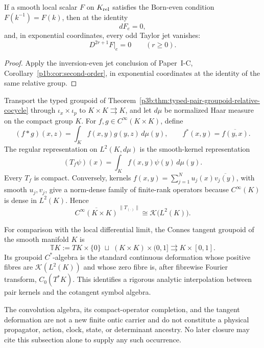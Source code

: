 \documentclass[11pt,a4paper]{article}
\begin{document}
\begin{corollary}
\label{p3b:cor:born-even-odd-jets}
If a smooth local scalar \(F\) on \(K_{\rm rel}\) satisfies the Born-even
condition \(F(k^{-1})=F(k)\), then at the identity
\[
 dF_e=0,
\]
and, in exponential coordinates, every odd Taylor jet vanishes:
\[
 \boxed{D^{2r+1}F|_e=0\qquad(r\ge0).}
\]
\end{corollary}

\begin{proof}
Apply the inversion-even jet conclusion of Paper~I-C,
Corollary~\ref{p1b:cor:second-order}, in exponential coordinates at the
identity of the same relative group.
\end{proof}

Transport the typed groupoid of
Theorem~\ref{p3b:thm:typed-pair-groupoid-relative-cocycle} through
\(\iota_x\times\iota_p\) to \(K\times K\rightrightarrows K\), and let
\(d\mu\) be normalized Haar measure on the compact group \(K\).  For
\(f,g\in C^\infty(K\times K)\), define
\[
 (f*g)(x,z)=\int_K f(x,y)g(y,z)\,d\mu(y),
 \qquad
 f^*(x,y)=\overline{f(y,x)}.
\]
The regular representation on \(L^2(K,d\mu)\) is the smooth-kernel
representation
\[
 (T_f\psi)(x)=\int_K f(x,y)\psi(y)\,d\mu(y).
\]
Every \(T_f\) is compact.  Conversely, kernels
\(f(x,y)=\sum_{j=1}^N u_j(x)\overline{v_j(y)}\), with smooth \(u_j,v_j\),
give a norm-dense family of finite-rank operators because
\(C^\infty(K)\) is dense in \(L^2(K)\).  Hence
\[
 \overline{C^\infty(K\times K)}^{\,\|T_{(\cdot)}\|}
 \cong \mathcal K\bigl(L^2(K)\bigr).
\]

For comparison with the local differential limit, the Connes tangent
groupoid of the smooth manifold \(K\) is
\[
 \mathbb T K
 :=TK\times\{0\}\;\sqcup\;(K\times K)\times(0,1]
 \rightrightarrows K\times[0,1].
\]
Its groupoid \(C^*\)-algebra is the standard continuous deformation whose
positive fibres are \(\mathcal K(L^2(K))\) and whose zero fibre is, after
fibrewise Fourier transform, \(C_0(T^*K)\).  This identifies a rigorous
analytic interpolation between pair kernels and the cotangent symbol
algebra.

\begin{remark}
The convolution algebra, its compact-operator completion, and the tangent
deformation are not a new finite ontic carrier and do not constitute a
physical propagator, action, clock, state, or determinant ancestry.  No later
closure may cite this subsection alone to supply any such occurrence.
\end{remark}
\end{document}
